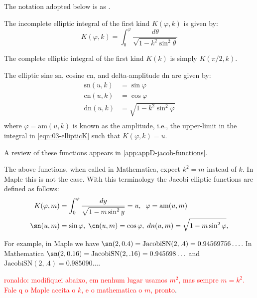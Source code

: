 The  notation adopted below is as \cite{armitage-2006}. 

\begin{definition}
The incomplete elliptic integral of the first kind $K(\varphi,k)$ is given by:
\begin{equation}
K(\varphi,k)=\int_0^{\varphi}\frac{d\theta}{\sqrt{1-k^2 \sin^2\theta}}
\label{eqn:03-ellipticK}
\end{equation}

The complete elliptic integral of the first kind $K(k)$ is simply $K(\pi/2,k)$.
\end{definition}

\begin{definition}
The elliptic sine $\text{sn}$, cosine $\text{cn}$, and delta-amplitude $\text{dn}$ are given by:
\begin{align*}
\text{sn}(u,k)&=\sin\varphi\\
\text{cn}(u,k)&=\cos\varphi\\
\text{dn}(u,k)&=\sqrt{1- k^2\sin^2\varphi}\\
\end{align*}
where $\varphi=\text{am}(u,k)$ is known as the amplitude, i.e., the upper-limit in the integral in \cref{eqn:03-ellipticK} such that $K(\varphi,k)=u$.
\end{definition}
A review of these functions appears in \cref{app:appD-jacob-functions}.

\begin{remark} The above functions, when called in Mathematica, expect $ k^2 =m$  instead of $k$. In Maple this is not the case.
With this terminology the  Jacobi elliptic functions are defined    as follows:
\begin{align*}
K(\varphi,m)&=\int_0^{\varphi} \frac{dy}{\sqrt{1-m\sin^2y}}=u,\;\; \varphi=\text{am}(u,m)\\
\sn(u,m)&=\sin\varphi,\; \cn(u,m)=\cos\varphi,\; dn(u,m)=\sqrt{1-m\sin^2\varphi}, \end{align*}


For example, in Maple we have $\sn(2,0.4)=\text{JacobiSN}(2,.4)=0.94569756\ldots$. In    Mathematica   $\sn(2,0.16)=\text{JacobiSN}(2,.16)=0.945698 \ldots$  and $\text{JacobiSN}(2,.4)=0.985090\ldots$.
\end{remark}

\textcolor{red}{ronaldo: modifiquei abaixo, em nenhum lugar usamos $m^2$, mas sempre $m=k^2$. Fale q o Maple aceita o $k$, e o mathematica o $m$, pronto}.

